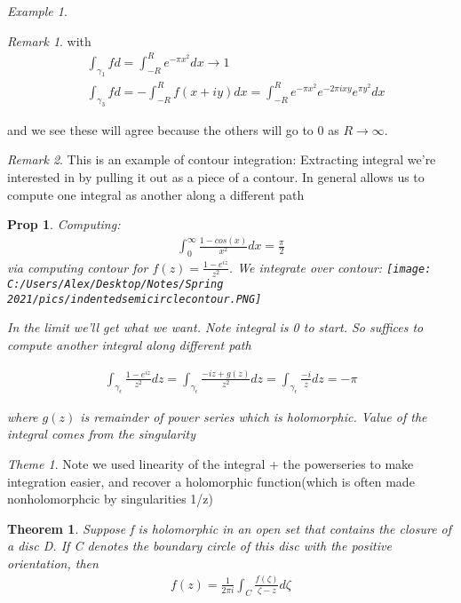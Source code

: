 \documentclass[11pt]{article}
\newtheorem{theorem}{Theorem}
\newtheorem{prop}{Prop}
\theoremstyle{remark}
\newtheorem{remark}{Remark}
\newtheorem{theme}{Theme}
\newtheorem{example}{Example}
\begin{document}
\begin{example}
\begin{remark}
	with 
	\begin{align*}
		&\int_{\gamma_1} f d = \int_{-R}^R e^{-\pi x^2}dx \to 1\\
		&\int_{\gamma_3} f d = -\int_{-R}^R f(x+iy)dx = \int_{-R}^R e^{-\pi x^2}e^{-2 \pi i xy}e^{\pi y^2} dx
	\end{align*}

	and we see these will agree because the others will go to 0 as $R \to \infty$. 
\end{remark}

\begin{remark}
	This is an example of contour integration: Extracting integral we're interested in by pulling it out as a piece of a contour. In general allows us to compute one integral as another along a different path
\end{remark}

\begin{prop}
	Computing:
	\begin{align*}
		\int_0^{\infty} \frac{1-cos(x)}{x^2}dx = \frac{\pi}{2}
	\end{align*}
	via computing contour for $f(z) = \frac{1-e^{iz}}{z^2}$. We integrate over contour:
	\texttt{[image: C:/Users/Alex/Desktop/Notes/Spring 2021/pics/indentedsemicirclecontour.PNG]}

	In the limit we'll get what we want. Note integral is 0 to start. So suffices to compute another integral along different path

	\begin{align*}
		\int_{\gamma_{\epsilon}} \frac{1-e^{iz}}{z^2}dz = \int_{\gamma_{\epsilon}} \frac{-iz + g(z)}{z^2}dz = \int_{\gamma_{\epsilon}} \frac{-i}{z}dz = - \pi
	\end{align*}

	where $g(z)$ is remainder of power series which is holomorphic. Value of the integral comes from the singularity
\end{prop}
\begin{theme}
	Note we used linearity of the integral + the powerseries to make integration easier, and recover a holomorphic function(which is often made nonholomorphcic by singularities 1/z)
\end{theme}

\begin{theorem}
	Suppose f is holomorphic in an open set that contains the closure of a disc D. If C denotes the boundary circle of this disc with the positive orientation, then
	\begin{align*}
		f(z) = \frac{1}{2 \pi i} \int_C \frac{f(\zeta)}{\zeta - z}d \zeta
	\end{align*}


\end{theorem}
\end{example}
\end{document}
